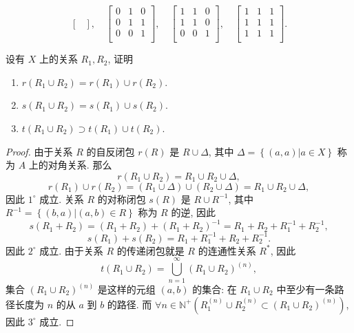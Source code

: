 \documentclass[10pt,UTF8]{book} %
\begin{document}
\begin{exercise}
\begin{sol}
\[\begin{bmatrix}
    \end{bmatrix}, \quad 
    \begin{bmatrix}
        0 & 1 & 0 \\
        0 & 1 & 1 \\
        0 & 0 & 1 \\
    \end{bmatrix}, \quad 
    \begin{bmatrix}
        1 & 1 & 0 \\
        1 & 1 & 0 \\
        0 & 0 & 1 \\
    \end{bmatrix}, \quad 
    \begin{bmatrix}
        1 & 1 & 1 \\
        1 & 1 & 1 \\
        1 & 1 & 1 \\
    \end{bmatrix}. \]
    \end{sol}
\end{exercise}

\begin{exercise}
    设有 $X$ 上的关系 $R_1, R_2$, 证明
    \begin{enumerate}[label={${\arabic*}^\circ$}, itemsep=0pt]
        \item $r(R_1 \cup R_2) = r(R_1) \cup r(R_2)$.
        \item $s(R_1 \cup R_2) = s(R_1) \cup s(R_2)$.
        \item $t(R_1 \cup R_2) \supset t(R_1) \cup t(R_2)$.
    \end{enumerate}
    \begin{proof}
        由于关系 $R$ 的自反闭包 $r(R)$ 是 $R \cup \Delta$,
        其中 $\Delta = \left\{
            (a,a) | a \in X
        \right\}$ 称为 $A$ 上的对角关系. 那么
        \[ r(R_1 \cup R_2) = R_1 \cup R_2 \cup \Delta, \]
        \[ r(R_1) \cup r(R_2) = (R_1 \cup \Delta) \cup (R_2 \cup \Delta)
        = R_1 \cup R_2 \cup \Delta, \]
        因此 $1^\circ$ 成立.
        关系 $R$ 的对称闭包 $s(R)$ 是 $R \cup R^{-1}$,
        其中 $R^{-1} = \left\{ (b,a) | (a,b) \in R \right\}$
        称为 $R$ 的逆, 因此
        \[ s(R_1 + R_2) = (R_1 + R_2) + (R_1 + R_2)^{-1}
        = R_1 + R_2 + R_1^{-1} + R_2^{-1}, \]
        \[ s(R_1) + s(R_2) = R_1 + R_1^{-1} + R_2 + R_2^{-1}. \]
        因此 $2^\circ$ 成立.
        由于关系 $R$ 的传递闭包就是 $R$ 的连通性关系 $R^*$,
        因此
        \[ t(R_1 \cup R_2) = \bigcup_{n=1}^{\infty}
        (R_1 \cup R_2)^{(n)}, \]
        集合 $(R_1 \cup R_2)^{(n)}$ 是这样的元组 $(a,b)$
        的集合: 在 $R_1 \cup R_2$ 中至少有一条路径长度为 $n$
        的从 $a$ 到 $b$ 的路径. 而 $\forall n \in \mathbb{N}^+ \left(
            R_1^{(n)} \cup R_2^{(n)} \subset (R_1 \cup R_2)^{(n)}
        \right)$, 因此 $3^\circ$ 成立.
    \end{proof}
\end{exercise}
\end{document}
